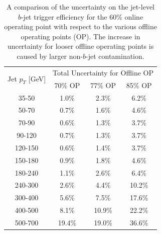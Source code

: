 \begin{table}[ht]
  \begin{center}
  \begin{tabular}{|c||c|c|c|}
    \hline
    \multirow{2}{*}{Jet $p_T$ [GeV]} &\multicolumn{3}{c|}{Total Uncertainty for Offline OP} \\ \cline{2-4} 

                & \hspace{1.5mm}70\% OP\hspace{1.5mm} & \hspace{1.5mm}77\% OP\hspace{1.5mm} & \hspace{1.5mm}85\% OP\hspace{1.5mm} \\
    \hline
    35-50   & 1.0\%   & 2.3\%   & 6.2\%  \\
    50-70   & 0.7\%   & 1.6\%   & 4.6\%  \\
    70-90   & 0.6\%   & 1.3\%   & 3.7\%  \\
    90-120  & 0.7\%   & 1.3\%   & 3.7\%  \\
    120-150 & 0.6\%   & 1.4\%   & 3.7\%  \\
    150-180 & 0.9\%   & 1.8\%   & 4.6\%  \\
    180-240 & 1.1\%   & 2.6\%   & 6.4\%  \\
    \hline          
    240-300 & 2.6\%   & 4.4\%   & 10.2\% \\
    300-400 & 5.6\%   & 7.5\%   & 17.6\% \\
    400-500 & 8.1\%   & 10.9\%  & 22.2\% \\
    500-700 & 19.4\%  & 19.0\%  & 36.6\% \\
    \hline
  \end{tabular}
  \vspace{10pt}
  \end{center}
    \vspace{-1.5em}
    \caption[A comparison of the uncertainty on the jet-level $b$-jet trigger efficiency
      for various offline operating points.]
            {
    A comparison of the uncertainty on the jet-level $b$-jet trigger efficiency
    for the 60\% online operating point with respect to the various offline operating points (OP).
    The increase in uncertainty for looser offline operating points is caused by larger non-$b$-jet contamination.
            }
  \label{tab:trig-bTrig_jetSys_opComp}
  \end{table}

\clearpage


